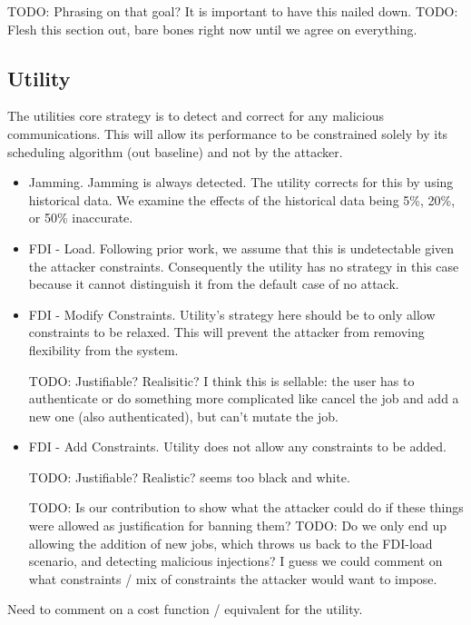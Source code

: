 \documentclass[conference]{IEEEtran}
\begin{document}
TODO: Phrasing on that goal?  It is important to have this nailed down.
TODO: Flesh this section out, bare bones right now until we agree on everything.

\subsection{Utility}

The utilities core strategy is to detect and correct for any malicious communications.  This will allow its performance to be
constrained solely by its scheduling algorithm (out baseline) and not by the attacker.

\begin{itemize}
\item Jamming.  Jamming is always detected.  The utility corrects for this by using historical data.  We examine the effects 
of the historical data being 5\%, 20\%, or 50\% inaccurate.

\item FDI - Load.  Following prior work, we assume that this is undetectable given the attacker constraints.  Consequently
the utility has no strategy in this case because it cannot distinguish it from the default case of no attack.

\item FDI - Modify Constraints.  Utility's strategy here should be to only allow constraints to be relaxed.  This will prevent
the attacker from removing flexibility from the system.

TODO: Justifiable?  Realisitic?  I think this is sellable: the user has to authenticate or do something more complicated like
cancel the job and add a new one (also authenticated), but can't mutate the job.

\item FDI - Add Constraints.  Utility does not allow any constraints to be added.

TODO: Justifiable?  Realistic?  seems too black and white.

TODO: Is our contribution to show what the attacker could do if these things were allowed as justification for banning them?
TODO: Do we only end up allowing the addition of new jobs, which throws us back to the FDI-load scenario, and detecting 
malicious injections?  I guess we could comment on what constraints / mix of constraints the attacker would want to impose.

\end{itemize}

Need to comment on a cost function / equivalent for the utility.
\end{document}
